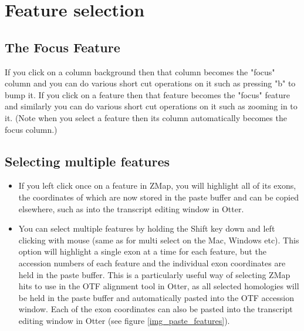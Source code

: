 \documentclass[letterpaper]{article}
\begin{document}
\clearpage
\section{Feature selection}

\subsection{The Focus Feature}
If you click on a column background then that column becomes the "focus" column and you can do various short cut operations on it such as pressing "b" to bump it. If you click on a feature then that feature becomes the "focus" feature and similarly you can do various short cut operations on it such as zooming in to it. (Note when you select a feature then its column automatically becomes the focus column.)


\subsection{Selecting multiple features}
\begin{itemize}
\item If you left click once on a feature in ZMap, you will highlight all of its exons, the coordinates of which are now stored in the paste buffer and can be copied elsewhere, such as into the transcript editing window in Otter.
\item You can select multiple features by holding the Shift key down and left clicking with mouse (same as for multi select on the Mac, Windows etc). This option will highlight a single exon at a time for each feature, but the accession numbers of each feature and the individual exon coordinates are held in the paste buffer. This is a particularly useful way of selecting ZMap hits to use in the OTF alignment tool in Otter, as all selected homologies will be held in the paste buffer and automatically pasted into the OTF accession window. Each of the exon coordinates can also be pasted into the transcript editing window in Otter (see figure \ref{img_paste_features}).
\end{itemize}
\end{document}
